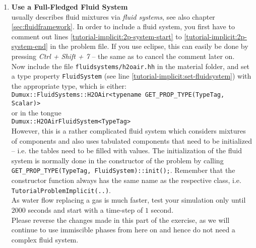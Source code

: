 \begin{enumerate}
\item \textbf{Use a Full-Fledged Fluid System} \\
\Dumux usually describes fluid mixtures via \textit{fluid systems}, see also chapter \ref{sec:fluidframework}.
In order to include a fluid system, you first have to comment out lines \ref{tutorial-implicit:2p-system-start}
to \ref{tutorial-implicit:2p-system-end} in the problem file. If you use eclipse,
this can easily be done by pressing \textit{Ctrl + Shift + 7} --
the same as to cancel the comment later on.\\
Now include the file \texttt{fluidsystems/h2oair.hh} in the material
folder, and set a type property \texttt{FluidSystem} (see line \ref{tutorial-implicit:set-fluidsystem})
with the appropriate type, which is either:\\
 \texttt{Dumux::FluidSystems::H2OAir<typename GET\_PROP\_TYPE(TypeTag, Scalar)>}\\
or in the \Dumux tongue\\
 \texttt{Dumux::H2OAirFluidSystem<TypeTag>}
\\
However, this is a rather complicated fluid system which
considers mixtures of components and also uses tabulated components that need to
be initialized -- i.e. the tables need to be filled with values.
The initialization of the fluid system is normally done in the constructor of the
problem by calling \texttt{GET\_PROP\_TYPE(TypeTag, FluidSystem)::init();}.
Remember that the constructor function always has the same name as the respective
class, i.e. \texttt{TutorialProblemImplicit(..)}.\\
As water flow replacing a gas is much faster, test your simulation only until $2000$
seconds and start with a time-step of $1$ second.\\
Please reverse the changes made in this part of the exercise, as we will continue
to use immiscible phases from here on and hence do not need a complex fluid system.


\end{enumerate}
